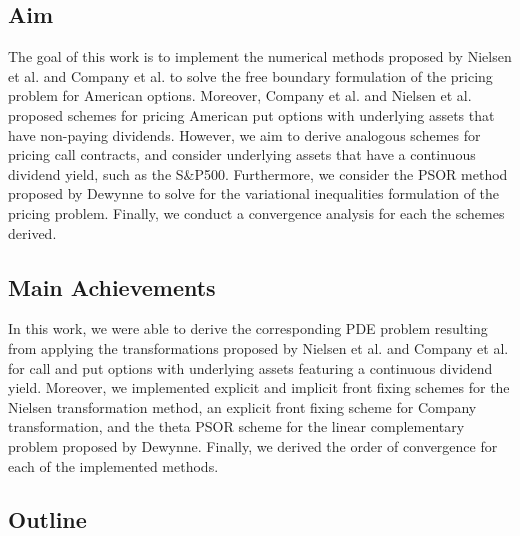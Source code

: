 \subsection{Aim} 

The goal of this work is to implement the numerical methods proposed by Nielsen et al.\cite{nielsen_2001} and Company et al.\cite{company_egorova_jodar_2014} to solve the free boundary formulation of the pricing problem for American options\cite{dewynne_howison_rupf_wilmott_1993}. Moreover, Company et al.\cite{company_egorova_jodar_2014} and Nielsen et al.\cite{nielsen_2001} proposed schemes for pricing American put options with underlying assets that have non-paying dividends. However, we aim to derive analogous schemes for pricing call contracts, and consider underlying assets that have a continuous dividend yield, such as the S\&P500.  Furthermore, we consider the PSOR method proposed by Dewynne\cite{dewynne_howison_rupf_wilmott_1993}\cite{dewynne_howison_wilmott_howison_1995} to solve for the variational inequalities formulation of the pricing problem. Finally, we conduct a convergence analysis for each the schemes derived.

\subsection{Main Achievements}

In this work, we were able to derive the corresponding PDE problem resulting from applying the transformations proposed by Nielsen et al.\cite{nielsen_2001} and Company et al.\cite{company_egorova_jodar_2014} for call and put options with underlying assets featuring a continuous dividend yield. Moreover, we implemented explicit and implicit front fixing schemes for the Nielsen transformation method\cite{nielsen_2001}, an explicit front fixing scheme for Company transformation, and the theta PSOR scheme for the linear complementary problem proposed by Dewynne\cite{dewynne_howison_wilmott_howison_1995}. Finally, we derived the order of convergence for each of the implemented methods.

\subsection{Outline}

